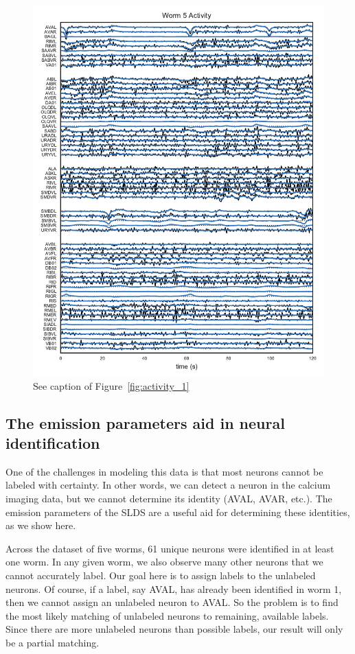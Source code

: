 \documentclass{article}
\begin{document}
\begin{figure}[h]
  \centering
  \includegraphics[width=5.5in]{figures/lds/y_4}
  \caption{See caption of Figure~\ref{fig:activity_1}}
  \label{fig:activity_5}
\end{figure}

\clearpage

\subsection{The emission parameters aid in neural identification}

One of the challenges in modeling this data is that most neurons
cannot be labeled with certainty.  In other words, we can detect a
neuron in the calcium imaging data, but we cannot determine its
identity (\textsf{AVAL}, \textsf{AVAR}, etc.).  The emission
parameters of the SLDS are a useful aid for determining these
identities, as we show here.

Across the dataset of five worms, 61 unique neurons were identified in
at least one worm.  In any given worm, we also observe many other
neurons that we cannot accurately label. Our goal here is to assign
labels to the unlabeled neurons.  Of course, if a label, say \textsf{AVAL}, has
already been identified in worm 1, then we cannot assign an unlabeled
neuron to \textsf{AVAL}.  So the problem is to find the most likely matching
of unlabeled neurons to remaining, available labels.  Since there are
more unlabeled neurons than possible labels, our result will only be
a partial matching. 
\end{document}
